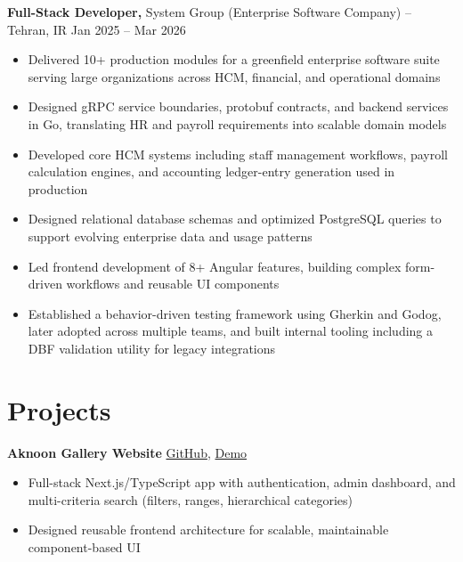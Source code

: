 \documentclass[11pt]{article}       %
\begin{document}
\textbf{Full-Stack Developer,} {System Group (Enterprise Software Company)} -- Tehran, IR \hfill Jan 2025 -- Mar 2026 \\
\vspace{-9pt}
\begin{itemize}
    \item Delivered 10+ production modules for a greenfield enterprise software suite serving large organizations across HCM, financial, and operational domains
    \item Designed gRPC service boundaries, protobuf contracts, and backend services in Go, translating HR and payroll requirements into scalable domain models
    \item Developed core HCM systems including staff management workflows, payroll calculation engines, and accounting ledger-entry generation used in production
    \item Designed relational database schemas and optimized PostgreSQL queries to support evolving enterprise data and usage patterns
    \item Led frontend development of 8+ Angular features, building complex form-driven workflows and reusable UI components
    \item Established a behavior-driven testing framework using Gherkin and Godog, later adopted across multiple teams, and built internal tooling including a DBF validation utility for legacy integrations
\end{itemize}

\vspace{-18.5pt}
\section*{Projects}

\textbf{Aknoon Gallery Website} \hfill \href{https://github.com/vandad1901/aknoon-gallery}{GitHub}, \href{https://aknoon.vandaddelavari.ir/}{Demo} \\
\vspace{-9pt}
\begin{itemize}
  \item Full-stack Next.js/TypeScript app with authentication, admin dashboard, and multi-criteria search (filters, ranges, hierarchical categories)
  \item Designed reusable frontend architecture for scalable, maintainable component-based UI
\end{itemize}
\end{document}
